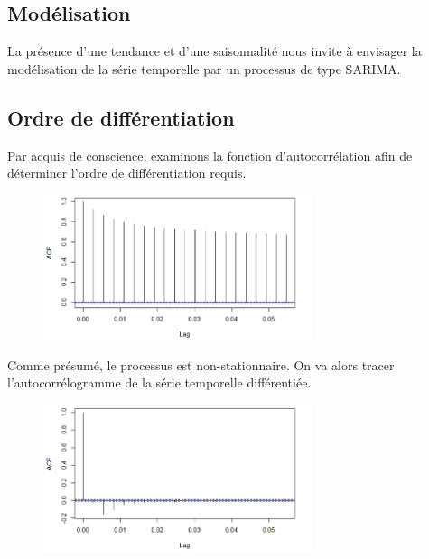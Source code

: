 \documentclass[../report.tex]{subfiles}
\begin{document}
\subsection{Modélisation}

\par La présence d’une tendance et d’une saisonnalité nous invite à envisager la modélisation de la série temporelle par un processus de type SARIMA.

\subsection{Ordre de différentiation}

\par Par acquis de conscience, examinons la fonction d’autocorrélation afin de déterminer l’ordre de différentiation requis.

\begin{figure}[H]
  \centering
    \includegraphics[width=0.7\textwidth]{images/part_1/autocorr1.png}
\end{figure}

\par Comme présumé, le processus est non-stationnaire. On va alors tracer l’autocorrélogramme de la série temporelle différentiée. 

\begin{figure}[H]
  \centering
    \includegraphics[width=0.7\textwidth]{images/part_1/autocorr2.png}
\end{figure}
\end{document}
